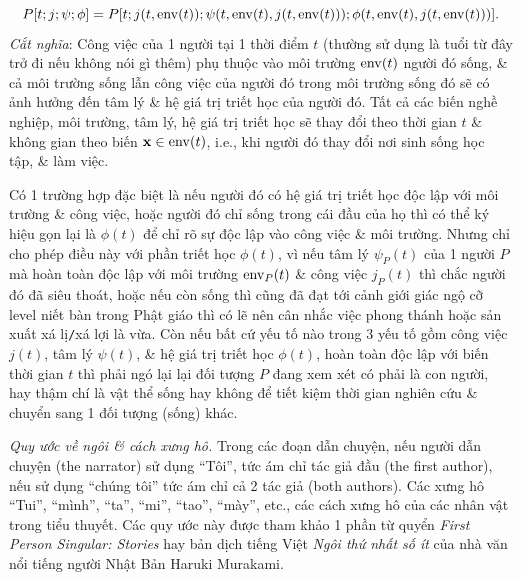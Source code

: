 \documentclass[12pt]{article}
\begin{document}
\begin{itemize}
	\begin{equation}
		P[t;j;\psi;\phi] = P[t;j(t,{\rm env}(t));\psi(t,{\rm env}(t),j(t,{\rm env}(t)));\phi(t,{\rm env}(t),j(t,{\rm env}(t)))].
	\end{equation}
	{\it Cắt nghĩa}: Công việc của 1 người tại 1 thời điểm $t$ (thường sử dụng là tuổi từ đây trở đi nếu không nói gì thêm) phụ thuộc vào môi trường ${\rm env}(t)$ người đó sống, \& cả môi trường sống lẫn công việc của người đó trong môi trường sống đó sẽ có ảnh hưởng đến tâm lý \& hệ giá trị triết học của người đó. Tất cả các biến nghề nghiệp, môi trường, tâm lý, hệ giá trị triết học sẽ thay đổi theo thời gian $t$ \& không gian theo biến ${\bf x}\in{\rm env}(t)$, i.e., khi người đó thay đổi nơi sinh sống học tập, \& làm việc.
	
	Có 1 trường hợp đặc biệt là nếu người đó có hệ giá trị triết học độc lập với môi trường \& công việc, hoặc người đó chỉ sống trong cái đầu của họ thì có thể ký hiệu gọn lại là $\phi(t)$ để chỉ rõ sự độc lập vào công việc \& môi trường. Nhưng chỉ cho phép điều này với phần triết học $\phi(t)$, vì nếu tâm lý $\psi_P(t)$ của 1 người $P$ mà hoàn toàn độc lập với môi trường ${\rm env}_P(t)$ \& công việc $j_P(t)$ thì chắc người đó đã siêu thoát, hoặc nếu còn sống thì cũng đã đạt tới cảnh giới giác ngộ cỡ level niết bàn trong Phật giáo thì có lẽ nên cân nhắc việc phong thánh hoặc sản xuất xá lị{\tt/}xá lợi là vừa. Còn nếu bất cứ yếu tố nào trong 3 yếu tố gồm công việc $j(t)$, tâm lý $\psi(t)$, \& hệ giá trị triết học $\phi(t)$, hoàn toàn độc lập với biến thời gian $t$ thì phải ngó lại lại đối tượng $P$ đang xem xét có phải là con người, hay thậm chí là vật thể sống hay không để tiết kiệm thời gian nghiên cứu \& chuyển sang 1 đối tượng (sống) khác.
\end{itemize}
{\it Quy ước về ngôi \& cách xưng hô.} Trong các đoạn dẫn chuyện, nếu người dẫn chuyện (the narrator) sử dụng ``Tôi'', tức ám chỉ tác giả đầu (the first author), nếu sử dụng ``chúng tôi'' tức ám chỉ cả 2 tác giả (both authors). Các xưng hô ``Tui'', ``mình'', ``ta'', ``mi'', ``tao'', ``mày'', etc., các cách xưng hô của các nhân vật trong tiểu thuyết. Các quy ước này được tham khảo 1 phần từ quyển {\it First Person Singular: Stories} \cite{Murakami_1st_person} hay bản dịch tiếng Việt {\it Ngôi thứ nhất số ít} \cite{Murakami_ngoi_1} của nhà văn nổi tiếng người Nhật Bản {\sc Haruki Murakami}.
\end{document}

